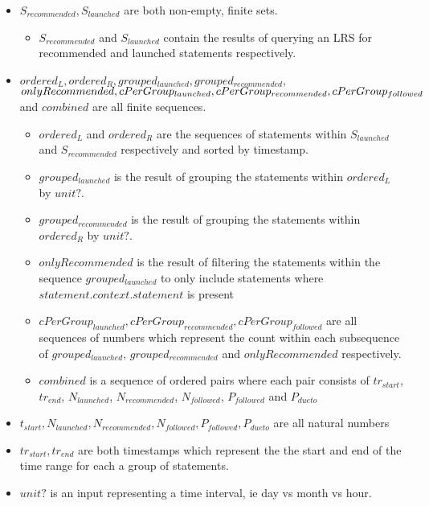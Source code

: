 \documentclass{article}
\begin{document}
\begin{itemize}
\item $S_{recommended}, S_{launched}$ are both non-empty, finite sets.
  \begin{itemize}
  \item $S_{recommended}$ and $S_{launched}$ contain
    the results of querying an LRS for recommended and launched
    statements respectively.
  \end{itemize}
\item $ordered_{L}, ordered_{R}, grouped_{launched},
  grouped_{recommended},$ $onlyRecommended, \\ cPerGroup_{launched},
  cPerGroup_{recommended}, cPerGroup_{followed}$ and $combined$ are
  all finite sequences.
  \begin{itemize}
    \item $ordered_{L}$ and $ordered_{R}$ are the sequences of
      statements within $S_{launched}$ and $S_{recommended}$
      respectively and sorted by timestamp.
    \item $grouped_{launched}$ is the result of grouping the
      statements within $ordered_{L}$ by $unit?$.
    \item $grouped_{recommended}$ is the result of grouping the
      statements within $ordered_{R}$ by $unit?$.
    \item $onlyRecommended$ is the result of filtering the statements
      within the sequence $grouped_{launched}$ to only include
      statements where $statement.context.statement$ is present
    \item $cPerGroup_{launched}, cPerGroup_{recommended},
      cPerGroup_{followed}$ are all sequences of numbers which
      represent the count within each subsequence of
      $grouped_{launched}$, $grouped_{recommended}$ and
      $onlyRecommended$ respectively.
    \item $combined$ is a sequence of ordered pairs where each pair
      consists of $tr_{start}$, $tr_{end}$, $N_{launched}$,
      $N_{recommended}$, $N_{followed}$, $P_{followed}$ and $P_{dueto}$
    \end{itemize}
\item $t_{start}, N_{launched}, N_{recommended}, N_{followed},
  P_{followed}, P_{dueto}$ are all natural numbers
\item $tr_{start}, tr_{end}$ are both timestamps which represent the
  the start and end of the time range for each a group of statements.
\item $unit?$ is an input representing a time interval, ie day vs
  month vs hour.
\end{itemize}
\end{document}

